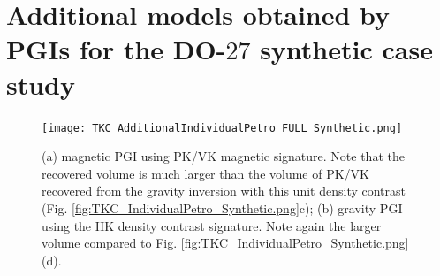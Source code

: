 

\section{Additional models obtained by PGIs for the DO-$27$ synthetic case study} \label{sec:additionalIndividual}

\begin{figure}
\centering
\texttt{[image: TKC\_AdditionalIndividualPetro\_FULL\_Synthetic.png]}
\caption{(a) magnetic PGI using PK/VK magnetic signature. Note that the recovered volume is much larger than the volume of PK/VK recovered from the gravity inversion with this unit density contrast (Fig. \ref{fig:TKC_IndividualPetro_Synthetic.png}c); (b) gravity PGI using the HK density contrast signature. Note again the larger volume compared to Fig. \ref{fig:TKC_IndividualPetro_Synthetic.png}(d).}
\label{fig:TKC_AdditionalIndividualPetro_FULL_Synthetic.png}
\end{figure}


